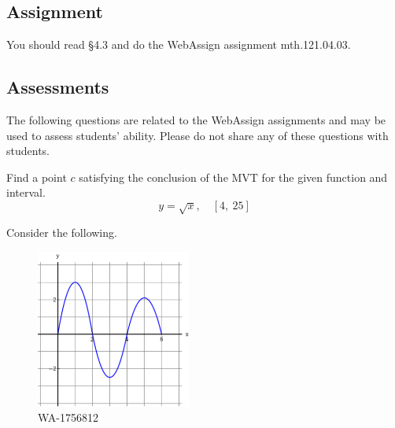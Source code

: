 \documentclass[12pt,addpoints, answers, fleqn]{exam}
\begin{document}
\subsection{Assignment}
You should read \S  4.3 and do the WebAssign assignment mth.121.04.03.
\vfill
\pagebreak
\begin{teacher}
\subsection{Assessments}
The following questions are related to the WebAssign assignments and may be used to assess students' ability. Please do not share any of these questions with students.
\begin{questions}	
\question 	%

Find a point $c$ satisfying the conclusion of the MVT for the given function and interval.
\[
y = \sqrt{x}, \quad \left[ 4, \ 25 \right]
\]

\begin{solution}
\end{solution}

\question 	%

Consider the following.
\begin{figure}[htbp] %
   \centering
   \includegraphics[width=2in]{./graphics/1756812.pdf} 
   \caption{WA-1756812}
   \label{fig:1756812}
\end{figure}
\end{questions}
\end{teacher}
\end{document}
